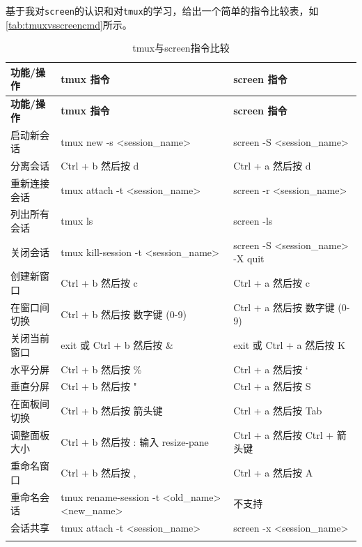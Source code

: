 基于我对\texttt{screen}的认识和对\texttt{tmux}的学习，给出一个简单的指令比较表，如\autoref{tab:tmuxvsscreencmd}所示。

\begin{longtable}{|l|l|l|}
    \hline
    \textbf{功能/操作} & \textbf{tmux 指令} & \textbf{screen 指令} \\
    \hline
    \endfirsthead

    \hline
    \textbf{功能/操作} & \textbf{tmux 指令} & \textbf{screen 指令} \\
    \hline
    \endhead

    \hline
    \endfoot

    \hline
    \endlastfoot

    启动新会话 & tmux new -s <session\_name> & screen -S <session\_name> \\
    \hline
    分离会话 & Ctrl + b 然后按 d & Ctrl + a 然后按 d \\
    \hline
    重新连接会话 & tmux attach -t <session\_name> & screen -r <session\_name> \\
    \hline
    列出所有会话 & tmux ls & screen -ls \\
    \hline
    关闭会话 & tmux kill-session -t <session\_name> & screen -S <session\_name> -X quit \\
    \hline
    创建新窗口 & Ctrl + b 然后按 c & Ctrl + a 然后按 c \\
    \hline
    在窗口间切换 & Ctrl + b 然后按 数字键 (0-9) & Ctrl + a 然后按 数字键 (0-9) \\
    \hline
    关闭当前窗口 & exit 或 Ctrl + b 然后按 \& & exit 或 Ctrl + a 然后按 K \\
    \hline
    水平分屏 & Ctrl + b 然后按 \% & Ctrl + a 然后按 ` \\
    \hline
    垂直分屏 & Ctrl + b 然后按 " & Ctrl + a 然后按 S \\
    \hline
    在面板间切换 & Ctrl + b 然后按 箭头键 & Ctrl + a 然后按 Tab \\
    \hline
    调整面板大小 & Ctrl + b 然后按 : 输入 resize-pane & Ctrl + a 然后按 Ctrl + 箭头键 \\
    \hline
    重命名窗口 & Ctrl + b 然后按 , & Ctrl + a 然后按 A \\
    \hline
    重命名会话 & tmux rename-session -t <old\_name> <new\_name> & 不支持 \\
    \hline
    会话共享 & tmux attach -t <session\_name> & screen -x <session\_name> \\
    \hline

    \caption{tmux与screen指令比较}
    \label{tab:tmuxvsscreencmd}

\end{longtable}

